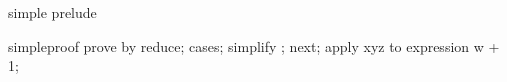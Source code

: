 \begin{zsection}
   \SECTION simple \parents prelude
\end{zsection}

\begin{zproof}{simpleproof}
prove     by
                  reduce;
cases;
  simplify ;
next;
  apply xyz to expression w + 1;
\end{zproof}


